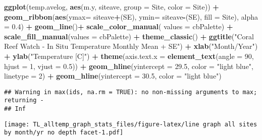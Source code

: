 \documentclass[
]{article}
\newenvironment{Shaded}{\begin{snugshade}}{\end{snugshade}}
\newcommand{\DataTypeTok}[1]{\textcolor[rgb]{0.13,0.29,0.53}{#1}}
\newcommand{\DecValTok}[1]{\textcolor[rgb]{0.00,0.00,0.81}{#1}}
\newcommand{\FloatTok}[1]{\textcolor[rgb]{0.00,0.00,0.81}{#1}}
\newcommand{\KeywordTok}[1]{\textcolor[rgb]{0.13,0.29,0.53}{\textbf{#1}}}
\newcommand{\NormalTok}[1]{#1}
\newcommand{\OperatorTok}[1]{\textcolor[rgb]{0.81,0.36,0.00}{\textbf{#1}}}
\newcommand{\StringTok}[1]{\textcolor[rgb]{0.31,0.60,0.02}{#1}}
\begin{document}
\begin{Shaded}
\begin{Highlighting}[]
\KeywordTok{ggplot}\NormalTok{(temp.avelog, }\KeywordTok{aes}\NormalTok{(m.y, siteave, }\DataTypeTok{group =}\NormalTok{ Site, }\DataTypeTok{color =}\NormalTok{ Site)) }\OperatorTok{+}\StringTok{ }
\StringTok{   }\KeywordTok{geom_ribbon}\NormalTok{(}\KeywordTok{aes}\NormalTok{(}\DataTypeTok{ymax=}\NormalTok{ siteave}\OperatorTok{+}\NormalTok{(SE), }\DataTypeTok{ymin=}\NormalTok{ siteave}\OperatorTok{-}\NormalTok{(SE), }\DataTypeTok{fill =}\NormalTok{ Site), }\DataTypeTok{alpha =} \FloatTok{0.4}\NormalTok{) }\OperatorTok{+}
\StringTok{   }\KeywordTok{geom_line}\NormalTok{()}\OperatorTok{+}
\StringTok{   }\KeywordTok{scale_color_manual}\NormalTok{( }\DataTypeTok{values =}\NormalTok{ cbPalette) }\OperatorTok{+}
\StringTok{   }\KeywordTok{scale_fill_manual}\NormalTok{(}\DataTypeTok{values =}\NormalTok{ cbPalette) }\OperatorTok{+}
\StringTok{   }\KeywordTok{theme_classic}\NormalTok{() }\OperatorTok{+}
\StringTok{   }\KeywordTok{ggtitle}\NormalTok{(}\StringTok{"Coral Reef Watch - In Situ Temperature Monthly Mean + SE"}\NormalTok{) }\OperatorTok{+}
\StringTok{   }\KeywordTok{xlab}\NormalTok{(}\StringTok{"Month/Year"}\NormalTok{) }\OperatorTok{+}\StringTok{ }\KeywordTok{ylab}\NormalTok{(}\StringTok{"Temperature [C]"}\NormalTok{) }\OperatorTok{+}
\StringTok{   }\KeywordTok{theme}\NormalTok{(}\DataTypeTok{axis.text.x =} \KeywordTok{element_text}\NormalTok{(}\DataTypeTok{angle =} \DecValTok{90}\NormalTok{, }\DataTypeTok{hjust =} \DecValTok{1}\NormalTok{, }\DataTypeTok{vjust =} \FloatTok{0.5}\NormalTok{)) }\OperatorTok{+}
\StringTok{      }\KeywordTok{geom_hline}\NormalTok{(}\DataTypeTok{yintercept =} \FloatTok{29.5}\NormalTok{, }\DataTypeTok{color =} \StringTok{"light blue"}\NormalTok{, }\DataTypeTok{linetype =} \DecValTok{2}\NormalTok{) }\OperatorTok{+}
\StringTok{   }\KeywordTok{geom_hline}\NormalTok{(}\DataTypeTok{yintercept =} \FloatTok{30.5}\NormalTok{, }\DataTypeTok{color =} \StringTok{"light blue"}\NormalTok{) }
\end{Highlighting}
\end{Shaded}

\begin{verbatim}
## Warning in max(ids, na.rm = TRUE): no non-missing arguments to max; returning -
## Inf
\end{verbatim}

\texttt{[image: TL\_alltemp\_graph\_stats\_files/figure-latex/line graph all sites by month/yr no depth facet-1.pdf]}
\end{document}
